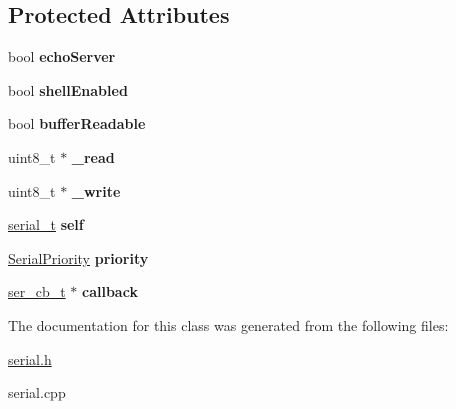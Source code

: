 \subsection*{Protected Attributes}
\begin{DoxyCompactItemize}
\item 
\mbox{\label{classSerial_a71585071c3169b915300f84557d273d3}} 
bool {\bfseries echo\+Server}
\item 
\mbox{\label{classSerial_a3ae40010a266baadc7a7d1c655d0f3ab}} 
bool {\bfseries shell\+Enabled}
\item 
\mbox{\label{classSerial_a58f8acbb0746b9dce8992d68ab380098}} 
bool {\bfseries buffer\+Readable}
\item 
\mbox{\label{classSerial_a461b01260601124608caefb58aa97321}} 
uint8\+\_\+t $\ast$ {\bfseries \+\_\+read}
\item 
\mbox{\label{classSerial_adf357435a54ad0273470165af0b32b40}} 
uint8\+\_\+t $\ast$ {\bfseries \+\_\+write}
\item 
\mbox{\label{classSerial_ace848b00193579670c9092e2866b04c5}} 
\hyperlink{structserial__t}{serial\+\_\+t} {\bfseries self}
\item 
\mbox{\label{classSerial_a456da36721b84dab734da1b47e39545e}} 
\hyperlink{serial_8h_aa8b6628780447bd68953ca27d2f1acd8}{Serial\+Priority} {\bfseries priority}
\item 
\mbox{\label{classSerial_aa18535152da1ad701fc2470451974c32}} 
\hyperlink{serial_8h_ae45e33beead6f4d4d7ec9ce44c4bcc83}{ser\+\_\+cb\+\_\+t} $\ast$ {\bfseries callback}
\end{DoxyCompactItemize}


The documentation for this class was generated from the following files\+:\begin{DoxyCompactItemize}
\item 
\hyperlink{serial_8h}{serial.\+h}\item 
serial.\+cpp\end{DoxyCompactItemize}
